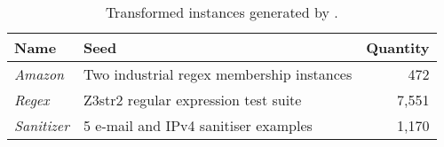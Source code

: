 \begin{table}[t]
    \centering
    \caption{Transformed instances generated by \transformer{}.}
    \label{tbl:transformed}
    \begin{tabular}{|l|l|r|}
        \hline
        \textbf{Name}      & \textbf{Seed}                             & \textbf{Quantity} \\ \hline
        \textit{Amazon}    & Two industrial regex membership instances & 472 \\ \hline
        \textit{Regex}     & Z3str2 regular expression test suite      & 7,551 \\ \hline
        \textit{Sanitizer} & 5 e-mail and IPv4 sanitiser examples      & 1,170 \\ \hline
    \end{tabular}
\end{table}

